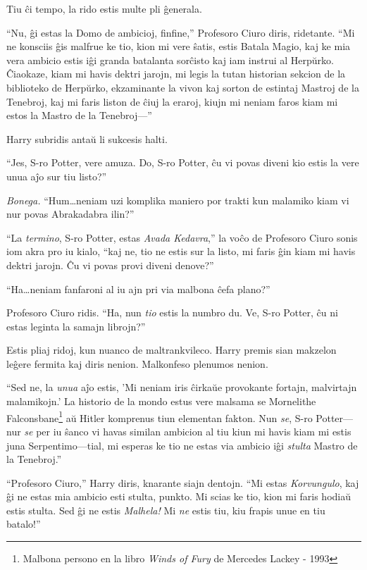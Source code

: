 Tiu ĉi tempo, la rido estis multe pli ĝenerala.

``Nu, ĝi estas la Domo de ambicioj, finfine,'' Profesoro Ciuro diris,
ridetante. ``Mi ne konsciis ĝis malfrue ke tio, kion mi vere ŝatis,
estis Batala Magio, kaj ke mia vera ambicio estis iĝi granda batalanta
sorĉisto kaj iam instrui al Herpŭrko. Ĉiaokaze, kiam mi havis dektri
jarojn, mi legis la tutan historian sekcion de la biblioteko de
Herpŭrko, ekzaminante la vivon kaj sorton de estintaj Mastroj de la
Tenebroj, kaj mi faris liston de ĉiuj la eraroj, kiujn mi neniam faros
kiam mi estos la Mastro de la Tenebroj—''  

Harry subridis antaŭ li sukcesis halti.

``Jes, S-ro Potter, vere amuza. Do, S-ro Potter, ĉu vi povas diveni
kio estis la vere unua aĵo sur tiu listo?''

\emph{Bonega.} ``Hum\ldots neniam uzi komplika maniero por trakti kun
malamiko kiam vi nur povas Abrakadabra ilin?''

``La \emph{termino}, S-ro Potter, estas \emph{Avada Kedavra},'' la
voĉo de Profesoro Ciuro sonis iom akra pro iu kialo, ``kaj ne, tio ne
estis sur la listo, mi faris ĝin kiam mi havis dektri jarojn. Ĉu vi
povas provi diveni denove?'' 

``Ha\ldots neniam fanfaroni al iu ajn pri via malbona ĉefa plano?''

Profesoro Ciuro ridis. ``Ha, nun \emph{tio} estis la numbro du. Ve,
S-ro Potter, ĉu ni estas leginta la samajn librojn?''

Estis pliaj ridoj, kun nuanco de maltrankvileco. Harry premis sian
makzelon leĝere fermita kaj diris nenion. Malkonfeso plenumos nenion.

``Sed ne, la \emph{unua} aĵo estis, 'Mi neniam iris ĉirkaŭe provokante
fortajn, malvirtajn malamikojn.' La historio de la mondo estus vere
malsama se Mornelithe Falconsbane\footnote{Malbona persono en la libro
\emph{Winds of Fury} de Mercedes Lackey - 1993} aŭ Hitler komprenus tiun
elementan fakton. Nun \emph{se}, S-ro Potter—nur \emph{se} per iu
ŝanco vi havas similan ambicion al tiu kiun mi havis kiam mi estis
juna Serpentimo—tial, mi esperas ke tio ne estas via ambicio iĝi
\emph{stulta} Mastro de la Tenebroj.''

``Profesoro Ciuro,'' Harry diris, knarante siajn dentojn. ``Mi estas
\emph{Korvungulo}, kaj ĝi ne estas mia ambicio esti stulta, punkto. Mi
scias ke tio, kion mi faris hodiaŭ estis stulta. Sed ĝi ne estis
\emph{Malhela!} Mi \emph{ne} estis tiu, kiu frapis unue en tiu
batalo!''

